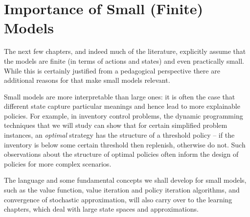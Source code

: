 

\section{Importance of Small (Finite) Models}

The next few chapters, and indeed much of the literature, explicitly assume that the models are finite (in terms of actions and states) and even practically small. While this is certainly justified from a pedagogical perspective there are additional reasons for that make small models relevant. 


Small models are more interpretable than large ones: it is often the case that different state capture particular meanings and hence lead to more explainable policies. For example, in inventory control problems, the dynamic programming techniques that we will study can show that for certain simplified problem instances, an \textit{optimal} strategy has the structure of a threshold policy -- if the inventory is below some certain threshold then replenish, otherwise do not. Such observations about the structure of optimal policies often inform the design of policies for more complex scenarios.

The language and some fundamental concepts we shall develop for small models, such as the value function, value iteration and policy iteration algorithms, and convergence of stochastic approximation, will also carry over to the learning chapters, which deal with large state spaces and approximations.

